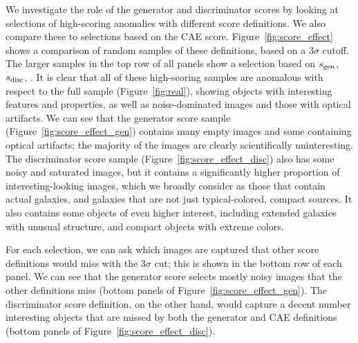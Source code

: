 We investigate the role of the generator and discriminator scores by looking at selections of high-scoring anomalies with different score definitions.
We also compare these to selections based on the CAE score.
Figure~\ref{fig:score_effect} shows a comparison of random samples of these definitions, based on a $3\sigma$ cutoff.
The larger samples in the top row of all panels show a selection based on $s_\mathrm{gen}$, $s_\mathrm{disc}$, .
It is clear that all of these high-scoring samples are anomalous with respect to the full sample (Figure~\ref{fig:real}), showing objects with interesting features and properties, as well as noise-dominated images and those with optical artifacts.
We can see that the generator score sample (Figure~\ref{fig:score_effect_gen}) contains many empty images and some containing optical artifacts; the majority of the images are clearly scientifically uninteresting. 
The discriminator score sample (Figure~\ref{fig:score_effect_disc}) also has some noisy and saturated images, but it contains a significantly higher proportion of interesting-looking images, which we broadly consider as those that contain actual galaxies, and galaxies that are not just typical-colored, compact sources.
It also contains some objects of even higher interest, including extended galaxies with unusual structure, and compact objects with extreme colors.

For each selection, we can ask which images are captured that other score definitions would miss with the $3\sigma$ cut; this is shown in the bottom row of each panel.
We can see that the generator score selects mostly noisy images that the other definitions miss (bottom panels of Figure~\ref{fig:score_effect_gen}). 
The discriminator score definition, on the other hand, would capture a decent number interesting objects that are missed by both the generator and CAE definitions (bottom panels of Figure~\ref{fig:score_effect_disc}).

